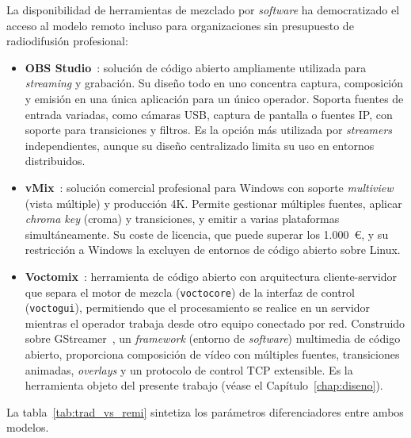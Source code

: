 La disponibilidad de herramientas de mezclado por \textit{software} ha democratizado el acceso
al modelo remoto incluso para organizaciones sin presupuesto de radiodifusión profesional:

\begin{itemize}
  \item \textbf{OBS Studio}~\cite{obs_studio}: solución de código abierto ampliamente
  utilizada para \textit{streaming} y grabación. Su diseño todo en uno concentra
  captura, composición y emisión en una única aplicación para un único operador.
  Soporta fuentes de entrada variadas, como cámaras USB, captura de pantalla o fuentes
  IP, con soporte para transiciones y filtros. Es la opción más utilizada por
  \textit{streamers} independientes, aunque su diseño centralizado limita su uso en
  entornos distribuidos.

  \item \textbf{vMix}~\cite{vmix_software}: solución comercial profesional para Windows
  con soporte \textit{multiview} (vista múltiple) y producción 4K. Permite gestionar múltiples
  fuentes, aplicar \textit{chroma key} (croma) y transiciones, y emitir a varias plataformas
  simultáneamente. Su coste de licencia, que puede superar los 1.000~\euro, y su
  restricción a Windows la excluyen de entornos de código abierto sobre Linux.

  \item \textbf{Voctomix}~\cite{voctomix_github}: herramienta de código abierto con
  arquitectura cliente-servidor que separa el motor de mezcla (\texttt{voctocore}) de
  la interfaz de control (\texttt{voctogui}), permitiendo que el procesamiento se
  realice en un servidor mientras el operador trabaja desde otro equipo conectado por
  red. Construido sobre GStreamer~\cite{gstreamer_docs}, un \textit{framework} (entorno
  de \textit{software}) multimedia de código abierto, proporciona composición de vídeo con
  múltiples fuentes, transiciones animadas, \textit{overlays} y un protocolo de
  control TCP extensible. Es la herramienta objeto del presente trabajo (véase el
  Capítulo~\ref{chap:diseno}).
\end{itemize}

La tabla~\ref{tab:trad_vs_remi} sintetiza los parámetros diferenciadores entre ambos modelos.

